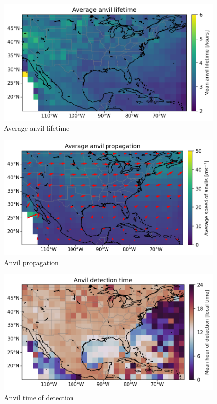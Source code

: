 \begin{figure}[tp]
    \centering
    \includegraphics[width=\textwidth]{figures/ch2_14.png}
    \caption{Average anvil lifetime}
    \label{fig:anvil_lifetime_map}
\end{figure}

\begin{figure}[tp]
    \centering
    \includegraphics[width=\textwidth]{figures/ch2_15.png}
    \caption{Anvil propagation}
    \label{fig:anvil_propagation_map}
\end{figure}

\begin{figure}[tp]
    \centering
    \includegraphics[width=\textwidth]{figures/ch2_16.png}
    \caption{Anvil time of detection}
    \label{fig:anvil_detection_time_map}
\end{figure}

